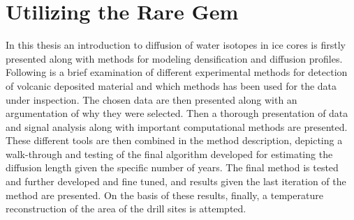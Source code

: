 \documentclass[../../CompleteThesis2/Complete_2ndDraft]{subfiles}
\begin{document}
	\section[Using the Rare Gem]{Utilizing the Rare Gem}
	\label{Sec:UtilizinGem}
	In this thesis an introduction to diffusion of water isotopes in ice cores is firstly presented along with methods for modeling densification and diffusion profiles. Following is a brief examination of different experimental methods for detection of volcanic deposited material and which methods has been used for the data under inspection. The chosen data are then presented along with an argumentation of why they were selected. Then a thorough presentation of data and signal analysis along with important computational methods are presented. These different tools are then combined in the method description, depicting a walk-through and testing of the final algorithm developed for estimating the diffusion length given the specific number of years. The final method is tested and further developed and fine tuned, and results given the last iteration of the method are presented. On the basis of these results, finally, a temperature reconstruction of the area of the drill sites is attempted. 
	
\end{document}
